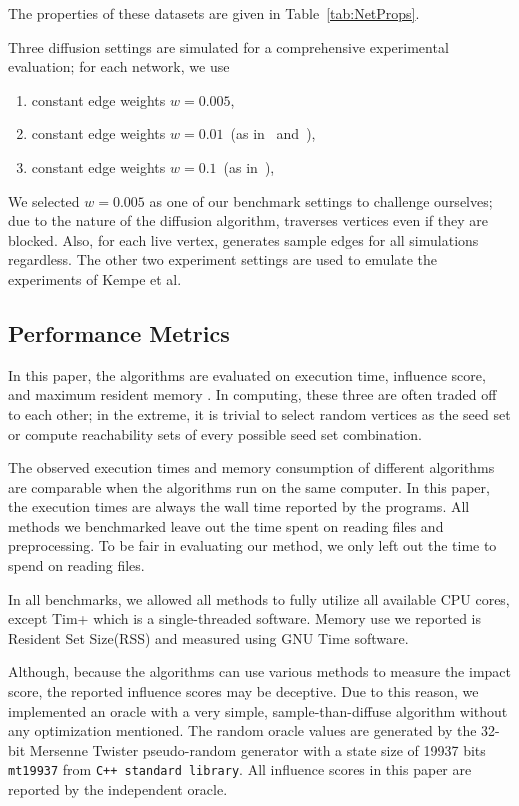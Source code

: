 \documentclass[10pt,journal,compsoc]{IEEEtran}
\newcommand\acro{{\sc{HyperFuseR\xspace}\xspace}\xspace}
\begin{document}
The properties of these datasets are given in Table~\ref{tab:NetProps}. 

Three diffusion settings are simulated for a comprehensive experimental evaluation; for each network, we use 
\begin{enumerate}
    \item constant edge weights $w = 0.005$,
    \item constant edge weights $w = 0.01$~(as in~\cite{kempe2003maximizing} and~\cite{MixGreedy}),
    \item constant edge weights $w = 0.1$~(as in~\cite{kempe2003maximizing}),
\end{enumerate}

We selected $w=0.005$ as one of our benchmark settings to challenge ourselves; due to the nature of the diffusion algorithm, \acro traverses vertices even if they are blocked. Also, for each live vertex, \acro generates sample edges for all simulations regardless. The other two experiment settings are used to emulate the experiments of Kempe et al.~\cite{kempe2003maximizing}

\subsection{Performance Metrics}

In this paper, the algorithms are evaluated on execution time, influence score, and maximum resident memory . In computing, these three are
often traded off to each other; in the extreme, it is trivial to select random vertices as the seed set or compute reachability sets of every possible seed set combination. 

The observed execution times and memory consumption of different algorithms are comparable when the algorithms run on the same computer.
In this paper, the execution times are always the wall time reported by the programs.
All methods we benchmarked leave out the time spent on reading files and preprocessing. To be fair in evaluating our method, we only left out the time to spend on reading files. 

In all benchmarks, we allowed all methods to fully utilize all available CPU cores, except {\sc Tim+} which is a single-threaded software. Memory use we reported is Resident Set Size(RSS) and measured using GNU Time software.

Although, because the algorithms can use various methods to measure the impact score, the reported influence scores may be deceptive. 
Due to this reason, we implemented an oracle with a very simple, sample-than-diffuse algorithm without any optimization mentioned. The random oracle values are generated by the 32-bit Mersenne Twister pseudo-random generator with a state size of 19937 bits {\tt mt19937} from {\tt C++ standard library}. All influence scores in this paper are reported by the independent oracle.
\end{document}
